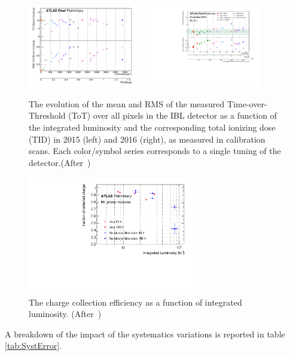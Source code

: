 \begin{figure}[!htpb]
\centering
\includegraphics[width=0.45\textwidth]{2015Calibration.pdf}
\includegraphics[width=0.45\textwidth]{2016Calibration.pdf}
\caption{The evolution of the mean and RMS of the measured Time-over-Threshold (ToT) over all pixels in the IBL detector as a function of the integrated luminosity and the corresponding total ionizing dose (TID) in 2015 (left) and 2016 (right), as measured in calibration scans. Each color/symbol series corresponds to a single tuning of the detector.(After~\cite{Miucci:2129027,Higashino:2252674})
\label{fig:ToTCalibrationDrift}}
\end{figure}


\begin{figure}[htpb!]
\centering
\includegraphics[width=0.65\textwidth]{CCE_Run2_approved.pdf}
\caption{The charge collection efficiency as a function of integrated luminosity. (After~\cite{Rossini:2273193})}
\label{fig:CCE:Run2}
\end{figure}

A breakdown of the impact of the systematics variations is reported in table \ref{tab:SystError}.


